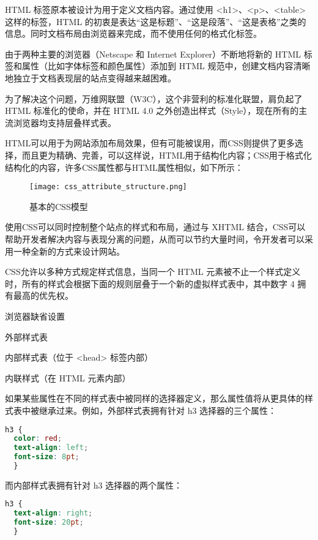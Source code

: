 HTML 标签原本被设计为用于定义文档内容。通过使用 <h1>、<p>、<table> 这样的标签，HTML 的初衷是表达“这是标题”、“这是段落”、“这是表格”之类的信息。同时文档布局由浏览器来完成，而不使用任何的格式化标签。

由于两种主要的浏览器（Netscape 和 Internet Explorer）不断地将新的 HTML 标签和属性（比如字体标签和颜色属性）添加到 HTML 规范中，创建文档内容清晰地独立于文档表现层的站点变得越来越困难。

为了解决这个问题，万维网联盟（W3C），这个非营利的标准化联盟，肩负起了 HTML 标准化的使命，并在 HTML 4.0 之外创造出样式（Style），现在所有的主流浏览器均支持层叠样式表。




HTML可以用于为网站添加布局效果，但有可能被误用，而CSS则提供了更多选择，而且更为精确、完善，可以这样说，HTML用于结构化内容；CSS用于格式化结构化的内容，许多CSS属性都与HTML属性相似，如下所示：

\begin{figure}[!h]
\centering
\texttt{[image: css\_attribute\_structure.png]}
\caption{基本的CSS模型}
\label{css_attribute_structure}
\end{figure}

使用CSS可以同时控制整个站点的样式和布局，通过与 XHTML 结合，CSS可以帮助开发者解决内容与表现分离的问题，从而可以节约大量时间，令开发者可以采用一种全新的方式来设计网站。


CSS允许以多种方式规定样式信息，当同一个 HTML 元素被不止一个样式定义时，所有的样式会根据下面的规则层叠于一个新的虚拟样式表中，其中数字 4 拥有最高的优先权。

\begin{compactitem}
\item 浏览器缺省设置
\item 外部样式表
\item 内部样式表（位于 <head> 标签内部）
\item 内联样式（在 HTML 元素内部）
\end{compactitem}

如果某些属性在不同的样式表中被同样的选择器定义，那么属性值将从更具体的样式表中被继承过来。例如，外部样式表拥有针对 h3 选择器的三个属性：

\begin{lstlisting}[language=CSS]
h3 {
  color: red;
  text-align: left;
  font-size: 8pt;
  }
\end{lstlisting}

而内部样式表拥有针对 h3 选择器的两个属性：

\begin{lstlisting}[language=CSS]
h3 {
  text-align: right; 
  font-size: 20pt;
  }
\end{lstlisting}

